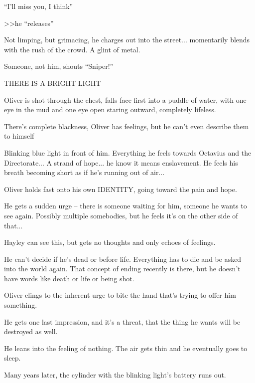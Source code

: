 ``I'll miss you, I think''



\textgreater \textgreater  he ``releases''

Not limping, but grimacing, he charges out into the street... momentarily blends with the rush of the crowd. A glint of metal. 

Someone, not him, shouts ``Sniper!''

THERE IS A BRIGHT LIGHT

Oliver is shot through the chest, falls face first into a puddle of water, with one eye in the mud and one eye open staring outward, completely lifeless.



There's complete blackness, Oliver has feelings, but he can't even describe them to himself

Blinking blue light in front of him.  Everything he feels towards Octavius and the Directorate... A strand of hope... he know it means enslavement. He feels his breath becoming short as if he's running out of air...

Oliver holds fast onto his own IDENTITY, going toward the pain and hope. 

He gets a sudden urge -- there is someone waiting for him, someone he wants to see again. Possibly multiple somebodies, but he feels it's on the other side of that...



Hayley can see this, but gets no thoughts and only echoes of feelings.



He can't decide if he's dead or before life. Everything has to die and be asked into the world again.  That concept of ending recently is there, but he doesn't have words like death or life or being shot.



Oliver clings to the inherent urge to bite the hand that's trying to offer him something. 



He gets one last impression, and it's a threat, that the thing he wants will be destroyed as well. 



He leans into the feeling of nothing.  The air gets thin and he eventually goes to sleep. 



Many years later, the cylinder with the blinking light's battery runs out. 





